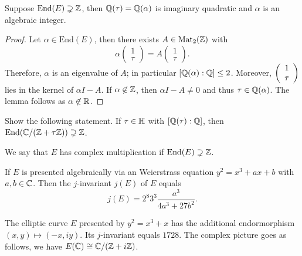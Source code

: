 \begin{lemma}
  \label{lem:tauimagquad}
  Suppose $\mathrm{End}(E) \supsetneq {\mathbb{Z}}$, then
  ${\mathbb{Q}}(\tau)={\mathbb{Q}}(\alpha)$
  is imaginary
  quadratic and $\alpha$ is an algebraic integer. 
\end{lemma}
\begin{proof}
  Let $\alpha\in \mathrm{End}(E)$, then there exists $A\in\mathrm{Mat}_2({\mathbb{Z}})$ with
  \begin{equation*}
    \alpha \left(
      \begin{array}{c}
        1 \\ \tau 
      \end{array}
    \right) = %
    A\left(
      \begin{array}{c}
        1 \\ \tau 
      \end{array}
    \right).
  \end{equation*}
  Therefore, $\alpha$ is an eigenvalue of $A$; in particular
  $[{\mathbb{Q}}(\alpha):{\mathbb{Q}}]\le 2$. Moreover, $\left( \begin{array}{c} {1} \\ {\tau} \end{array} \right)$ lies in the
  kernel of $\alpha I-A$. If $\alpha\not\in {\mathbb{Z}}$, then $\alpha
  I-A\not=0$ and thus $\tau \in {\mathbb{Q}}(\alpha)$. The lemma follows as
  $\alpha\not\in{\mathbb{R}}$. 
\end{proof}

\begin{exercise}
  Show the following statement. If $\tau \in{\mathbb{H}}$  with
  $[{\mathbb{Q}}(\tau):{\mathbb{Q}}]$, then $\mathrm{End}({\mathbb{C}}/({\mathbb{Z}}+\tau {\mathbb{Z}}))\supsetneq
  {\mathbb{Z}}$. 
\end{exercise}

\begin{definition}
  We say that $E$ has complex multiplication if
  $\mathrm{End}(E)\supsetneq {\mathbb{Z}}$. 
\end{definition}

If $E$ is presented algebraically via an Weierstrass equation $y^2 =
x^3+ax+b$ with $a,b\in{\mathbb{C}}$. Then the $j$-invariant $j(E)$ of $E$ equals
\begin{equation*}
  j(E) = 2^8 3^3 \frac{a^3}{4a^3+27b^2}. 
\end{equation*}

\begin{example}
  The elliptic curve $E$ presented by $y^2=x^3+x$ has the additional
  endormorphism
  $(x,y)\mapsto (-x, i y)$. Its $j$-invariant equals $1728$. The
  complex picture goes as follows, we have $E({\mathbb{C}})\cong {\mathbb{C}}/({\mathbb{Z}}+i
  {\mathbb{Z}})$. 
\end{example}

